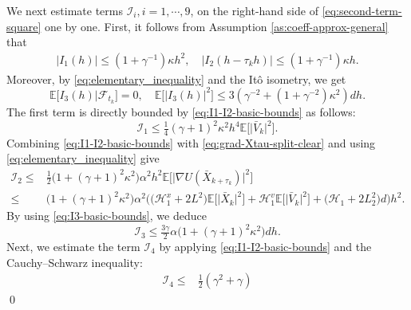 \documentclass[12pt]{article}
\numberwithin{equation}{section}
\renewenvironment{proof}%
  {\begin{trivlist}%
   \item[]\ignorespaces}%
  {\qed\end{trivlist}}
\newcommand{\E}{\mathbb{E}}
\newcommand{\X}{\bar{X}}
\newcommand{\V}{\bar{V}}
\renewcommand{\H}{\mathcal{H}}
\begin{document}
\begin{proof}
\begin{equation}
\end{equation}
We next estimate terms $\mathcal{I}_i, i=1,\cdots,9$, on the right-hand side of \eqref{eq:second-term-square} one by one. 
First, it follows from  Assumption \ref{as:coeff-approx-general} that
\begin{equation}
\label{eq:I1-I2-basic-bounds}
\begin{aligned}
|I_1(h)|
\leq
(1+\gamma^{-1})
\kappa
h^{2},
\quad 
|I_2(h-\tau_kh)|
\leq 
(1+\gamma^{-1})
\kappa
h.
\end{aligned}
\end{equation}
Moreover, by \eqref{eq:elementary_inequality} and the It\^o isometry, we get  
\begin{equation}
\label{eq:I3-basic-bounds}
\E 
\big[
I_3(h)
\big|
\mathcal{F}_{t_k}
\big]
= 
0,
\quad 
\E
\Big[
\big|
I_3(h)
\big|^2
\Big]
\leq 
3(\gamma^{-2}+(1+\gamma^{-2})
\kappa^2
)d 
h .
\end{equation}
The first term is directly bounded by \eqref{eq:I1-I2-basic-bounds} as follows:
\begin{equation}
\mathcal{I}_1
\leq
\tfrac{1}{4}
(\gamma+1)^2
\kappa^2
h^4
\mathbb{E}
\Big[
\big|
\bar{V}_k
\big|^2
\Big].
\end{equation}
Combining \eqref{eq:I1-I2-basic-bounds} with \eqref{eq:grad-Xtau-split-clear} and using \eqref{eq:elementary_inequality} give
\begin{equation}
\begin{aligned}
\mathcal{I}_2
\leq &
\tfrac{1}{2}
\big(
1 
+
(\gamma+1)^2
\kappa^2
\big)
\alpha^2
h^2
\mathbb{E}
\Big[
\big|
\nabla U(\bar{X}_{k+\tau_k})
\big|^2
\Big]
\\  
\leq &
\big(
1 
+
(\gamma+1)^2
\kappa^2
\big)
\alpha^2
\Big(
\big(
\H_1^x
+
2L^2
\big)
\E
\Big[
\big|
\X_k
\big|^2
\Big]
+
\H_1^v
\E
\Big[
\big|
\V_k
\big|^2
\Big]
+
\big(
\H_1
+
2L_2^2
\big)
d 
\Big)h^2.
\end{aligned}
\end{equation}
By using \eqref{eq:I3-basic-bounds}, we deduce 
\begin{equation}
\mathcal{I}_3
\leq 
\tfrac{3\gamma}{2}
\alpha
\big(
1 
+
(\gamma+1)^2
\kappa^2
\big)
d  h  .
\end{equation}
Next, we estimate the term $\mathcal I_4$ by applying \eqref{eq:I1-I2-basic-bounds} and the Cauchy–Schwarz inequality:
\begin{equation}
\begin{aligned}
\mathcal I_4
\leq &
\tfrac{1}{2}
(\gamma^2+\gamma)

\end{aligned}
\end{equation}
\end{proof}
\end{document}
